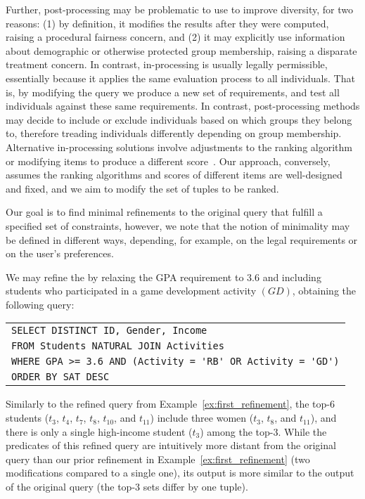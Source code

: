 Further, post-processing may be problematic to use to improve diversity, for two reasons: (1) by definition, it modifies the results after they were computed, raising a procedural fairness concern, and (2) it may explicitly use information about demographic or otherwise protected group membership, raising a disparate treatment concern. In contrast, in-processing %
is usually legally permissible, essentially because it applies the same evaluation process to all individuals. That is, by modifying the query we produce a new set of requirements, and test all individuals against these same requirements.  In contrast, post-processing methods may decide to include or exclude individuals based on which groups they belong to, therefore treading individuals differently depending on group membership.
Alternative in-processing solutions involve adjustments to the ranking algorithm~\cite{AJS19} or modifying items to produce a different score~\cite{KR18, CMV20}. Our approach, conversely, assumes the ranking algorithms and scores of different items are well-designed and fixed, and we aim to modify the set of tuples to be ranked.

 Our goal is to find minimal refinements to the original query that fulfill a specified set of constraints, however, we note that the notion of minimality may be defined in different ways, depending, for example, on the legal requirements or on the user's preferences.

 \begin{example}
    \label{ex:refine-and-distance}
    We may refine the \running{} by relaxing the GPA requirement to $3.6$ and including students who participated in a game development activity $(GD)$,  obtaining the following query: 
    \begin{center}
    \footnotesize
    \begin{tabular}{l}
        \verb"SELECT DISTINCT ID, Gender, Income "\\
        \verb"FROM Students NATURAL JOIN Activities"\\
        \verb"WHERE GPA >= 3.6 AND (Activity = 'RB' OR Activity = 'GD')"\\
        \verb"ORDER BY SAT DESC"\\
    \end{tabular}
    \end{center}
    Similarly to the refined query from Example~\ref{ex:first_refinement}, the top-$6$ students %
    ($t_3$, $t_4$, $t_7$, $t_8$, $t_{10}$, and $t_{11}$) include three women ($t_3$, $t_8$, and $t_{11}$), and there is only a single high-income student ($t_3$) among the top-$3$. While the predicates of this refined query are intuitively more distant from the original query than our prior refinement in Example~\ref{ex:first_refinement} (two modifications compared to a single one), its output is more similar to the output of the original query (the top-$3$ sets differ by one tuple).
    
\end{example}

